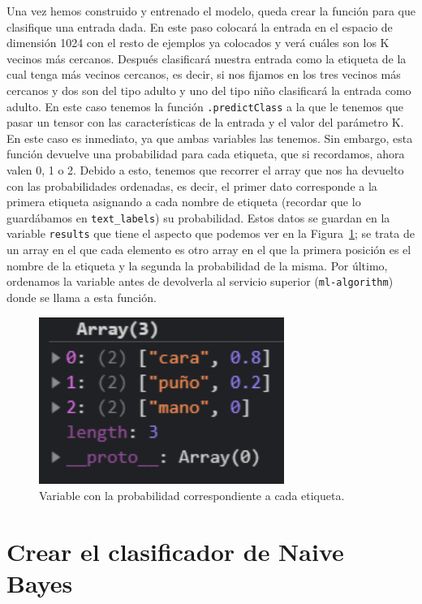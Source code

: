 \documentclass[a4paper, 12pt]{book}
\begin{document}
Una vez hemos construido y entrenado el modelo, queda crear la función para que clasifique una entrada dada. En este paso colocará la entrada en el espacio de dimensión 1024 con el resto de ejemplos ya colocados y verá cuáles son los K vecinos más cercanos. Después clasificará nuestra entrada como la etiqueta de la cual tenga más vecinos cercanos, es decir, si nos fijamos en los tres vecinos más cercanos y dos son del tipo adulto y uno del tipo niño clasificará la entrada como adulto. En este caso tenemos la función \texttt{.predictClass} a la que le tenemos que pasar un tensor con las características de la entrada y el valor del parámetro K. En este caso es inmediato, ya que ambas variables las tenemos. Sin embargo, esta función devuelve una probabilidad para cada etiqueta, que si recordamos, ahora valen 0, 1 o 2. Debido a esto, tenemos que recorrer el array que nos ha devuelto con las probabilidades ordenadas, es decir, el primer dato corresponde a la primera etiqueta asignando a cada nombre de etiqueta (recordar que lo guardábamos en \texttt{text\_labels}) su probabilidad. Estos datos se guardan en la variable \texttt{results} que tiene el aspecto que podemos ver en la Figura~\ref{fig:resultsknn}; se trata de un array en el que cada elemento es otro array en el que la primera posición es el nombre de la etiqueta y la segunda la probabilidad de la misma. Por último, ordenamos la variable antes de devolverla al servicio superior (\texttt{ml-algorithm}) donde se llama a esta función.

\begin{figure}
	\centering
	\includegraphics[width=8cm, keepaspectratio]{img/resultsknn}
	\caption{Variable con la probabilidad correspondiente a cada etiqueta.}				
	\label{fig:resultsknn}
\end{figure}

\section{Crear el clasificador de Naive Bayes} 
\label{sec:naivebayes}
\end{document}
